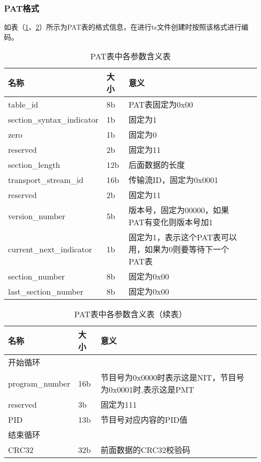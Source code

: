 \documentclass[bachelor]{thesis-uestc}
\begin{document}
     

\subsubsection{PAT格式}

如表（\ref{PAT表中各参数含义表}、\ref{PAT表中各参数含义表（续表）}）所示为PAT表的格式信息，在进行ts文件创建时按照该格式进行编码。
\begin{table}[!h]
\centering
\caption{PAT表中各参数含义表}
\label{PAT表中各参数含义表}
\begin{tabular}{lp{3cm}p{6cm}p{2cm}}
\toprule
名称	&  大小 & 意义 \\
\midrule

table\_id	 & 8b &	PAT表固定为0x00\\
section\_syntax\_indicator	&1b&	固定为1\\
zero	&1b&	固定为0\\
reserved	&2b&	固定为11\\
section\_length	&12b&	后面数据的长度\\
transport\_stream\_id	&16b&	传输流ID，固定为0x0001\\
reserved	&2b&	固定为11\\
version\_number	&5b&	版本号，固定为00000，如果PAT有变化则版本号加1\\
current\_next\_indicator	&1b&	固定为1，表示这个PAT表可以用，如果为0则要等待下一个PAT表\\
section\_number	&8b&	固定为0x00\\
last\_section\_number	&8b&	固定为0x00\\
\bottomrule 
\end{tabular}
\end{table}

\begin{table}[!h]
\centering
\caption{PAT表中各参数含义表（续表）}
\label{PAT表中各参数含义表（续表）}
\begin{tabular}{lp{3cm}p{6cm}p{2cm}}
\toprule
名称	&  大小 & 意义 \\
\midrule
开始循环	 	\\ 
program\_number	&16b&	节目号为0x0000时表示这是NIT，节目号为0x0001时,表示这是PMT\\
reserved	&3b&	固定为111\\
PID	&13b&	节目号对应内容的PID值\\
结束循环\\	 	 
CRC32	&32b&	前面数据的CRC32校验码\\

\bottomrule 
\end{tabular}
\end{table}
\end{document}
